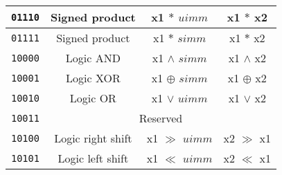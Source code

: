 \begin{center}
\begin{longtable}{|c|c|c|c|}
      \texttt{01110}                       &
      Signed product                       &
      x1 $*$ $uimm$                        &
      x1 $*$ x2                            \\ \hline
                                           
      \texttt{01111}                       &
      Signed product                       &
      x1 $*$ $simm$                        &
      x1 $*$ x2                            \\ \hline
                                           
      \texttt{10000}                       &
      Logic AND                            &
      x1 $\land$ $simm$                    &
      x1 $\land$ x2                        \\ \hline
                                           
      \texttt{10001}                       &
      Logic XOR                            &
      x1 $\oplus$ $simm$                   &
      x1 $\oplus$ x2                       \\ \hline
                                           
      \texttt{10010}                       &
      Logic OR                             &
      x1 $\lor$ $uimm$                     &
      x1 $\lor$ x2                         \\ \hline
                                           
      \texttt{10011}                       &
      \multicolumn{3}{c|}{Reserved}        \\ \hline

      \texttt{10100}                       &
      Logic right shift                    &
      x1 $\gg$ $uimm$                      &
      x2 $\gg$ x1                          \\ \hline
                                           
      \texttt{10101}                       &
      Logic left shift                     &
      x1 $\ll$ $uimm$                      &
      x2 $\ll$ x1                          \\ \hline
                                           

\end{longtable}
\end{center}
